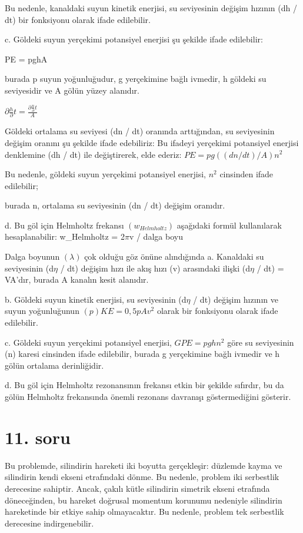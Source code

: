 \documentclass[12pt]{article}
\begin{document}
Bu nedenle, kanaldaki suyun kinetik enerjisi, su seviyesinin değişim hızının (dh / dt) bir fonksiyonu olarak ifade edilebilir.

c. Göldeki suyun yerçekimi potansiyel enerjisi şu şekilde ifade edilebilir:

PE = pghA

burada p suyun yoğunluğudur, g yerçekimine bağlı ivmedir, h göldeki su seviyesidir ve A gölün yüzey alanıdır.

$\partial \frac{h}{\partial}t=\frac{\partial\frac{n}{\partial}t}{A}$

Göldeki ortalama su seviyesi (dn / dt) oranında arttığından, su seviyesinin değişim oranını şu şekilde ifade edebiliriz: Bu ifadeyi yerçekimi potansiyel enerjisi denklemine (dh / dt) ile değiştirerek, elde ederiz:
\bigbreak
$PE = pg((dn/dt)/A)n^2$

Bu nedenle, göldeki suyun yerçekimi potansiyel enerjisi, $n^2$ cinsinden ifade edilebilir; 

burada n, ortalama su seviyesinin (dn / dt) değişim oranıdır.

d. Bu göl için Helmholtz frekansı $(w_{Helmholtz})$ aşağıdaki formül kullanılarak hesaplanabilir:
\bigbreak
w_{Helmholtz} = 2$\pi$v / dalga boyu

Dalga boyunun $(\lambda)$ çok olduğu göz önüne alındığında
\newpage
a. Kanaldaki su seviyesinin (d$\eta$ / dt) değişim hızı ile akış hızı (v) arasındaki ilişki (d$\eta$ / dt) = VA'dır, burada A kanalın kesit alanıdır.

b. Göldeki suyun kinetik enerjisi, su seviyesinin (d$\eta$ / dt) değişim hızının ve suyun yoğunluğunun  $(p) KE=0,5pAv^2$ olarak bir fonksiyonu olarak ifade edilebilir.

c. Göldeki suyun yerçekimi potansiyel enerjisi, $GPE= pghn^2$  göre su seviyesinin (n) karesi cinsinden ifade edilebilir, burada g yerçekimine bağlı ivmedir ve h gölün ortalama derinliğidir.

d. Bu göl için Helmholtz rezonansının frekansı etkin bir şekilde sıfırdır, bu da gölün Helmholtz frekansında önemli rezonans davranışı göstermediğini gösterir.
\newpage
\section{11. soru}

Bu problemde, silindirin hareketi iki boyutta gerçekleşir: düzlemde kayma ve silindirin kendi ekseni etrafındaki dönme. Bu nedenle, problem iki serbestlik derecesine sahiptir. Ancak, çakılı kütle silindirin simetrik ekseni etrafında döneceğinden, bu hareket doğrusal momentum korunumu nedeniyle silindirin hareketinde bir etkiye sahip olmayacaktır. Bu nedenle, problem tek serbestlik derecesine indirgenebilir.
\end{document}

